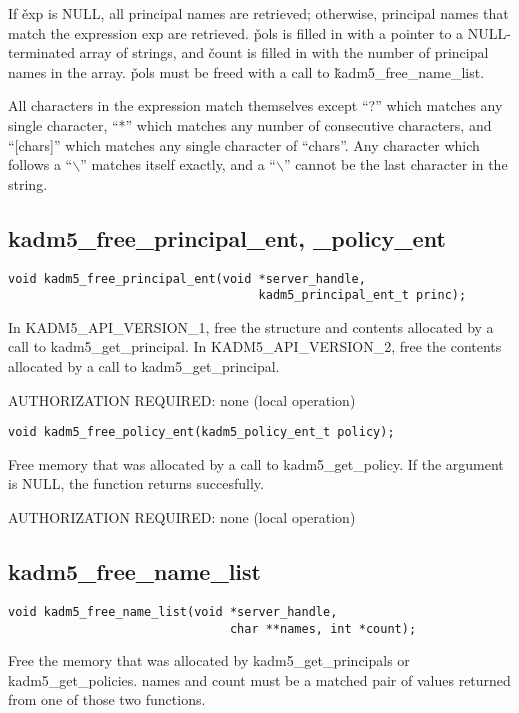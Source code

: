 If \v{exp} is NULL, all principal names are retrieved; otherwise,
principal names that match the expression exp are retrieved.  \v{pols}
is filled in with a pointer to a NULL-terminated array of strings, and
\v{count} is filled in with the number of principal names in the
array.  \v{pols} must be freed with a call to
\v{kadm5_free_name_list}.

All characters in the expression match themselves except ``?'' which
matches any single character, ``*'' which matches any number of
consecutive characters, and ``[chars]'' which matches any single
character of ``chars''. Any character which follows a ``$\backslash$''
matches itself exactly, and a ``$\backslash$'' cannot be the last
character in the string.

\subsection{kadm5_free_principal_ent, _policy_ent}

\begin{verbatim}
void kadm5_free_principal_ent(void *server_handle,
                                   kadm5_principal_ent_t princ);
\end{verbatim}

In KADM5_API_VERSION_1, free the structure and contents allocated by a
call to kadm5_get_principal.  In KADM5_API_VERSION_2, free the
contents allocated by a call to kadm5_get_principal.

AUTHORIZATION REQUIRED: none (local operation)

\begin{verbatim}
void kadm5_free_policy_ent(kadm5_policy_ent_t policy);
\end{verbatim}

Free memory that was allocated by a call to kadm5_get_policy.  If
the argument is NULL, the function returns succesfully.

AUTHORIZATION REQUIRED: none (local operation)

\subsection{kadm5_free_name_list}

\begin{verbatim}
void kadm5_free_name_list(void *server_handle,
                               char **names, int *count);
\end{verbatim}

Free the memory that was allocated by kadm5_get_principals or
kadm5_get_policies.  names and count must be a matched pair of
values returned from one of those two functions.

